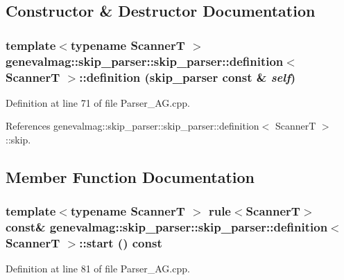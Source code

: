 \subsection{Constructor \& Destructor Documentation}
\hypertarget{structgenevalmag_1_1skip__parser_1_1definition_81f452faedc18942f3448db0209e34b7}{
\subsubsection[{definition}]{\setlength{\rightskip}{0pt plus 5cm}template$<$typename ScannerT $>$ genevalmag::skip\_\-parser::skip\_\-parser::definition$<$ ScannerT $>$::{\bf definition} ({\bf skip\_\-parser} const \& {\em self})}}
\label{structgenevalmag_1_1skip__parser_1_1definition_81f452faedc18942f3448db0209e34b7}




Definition at line 71 of file Parser\_\-AG.cpp.

References genevalmag::skip\_\-parser::skip\_\-parser::definition$<$ ScannerT $>$::skip.

\subsection{Member Function Documentation}
\hypertarget{structgenevalmag_1_1skip__parser_1_1definition_748139db24deb542da0afc2a5ff14a79}{
\subsubsection[{start}]{\setlength{\rightskip}{0pt plus 5cm}template$<$typename ScannerT $>$ rule$<$ScannerT$>$ const\& genevalmag::skip\_\-parser::skip\_\-parser::definition$<$ ScannerT $>$::start () const}}
\label{structgenevalmag_1_1skip__parser_1_1definition_748139db24deb542da0afc2a5ff14a79}




Definition at line 81 of file Parser\_\-AG.cpp.

